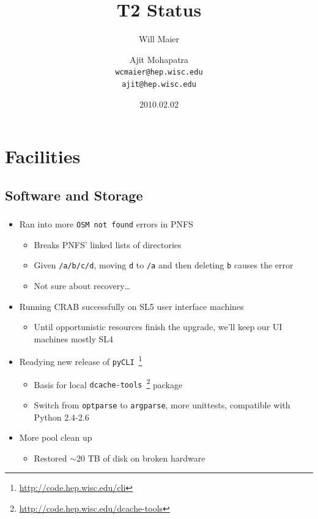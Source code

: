\documentclass{beamer}
\title{T2 Status}
\author[Maier, Mohapatra]{
    Will Maier \and Ajit Mohapatra\\
    {\tt wcmaier@hep.wisc.edu}\\
    {\tt ajit@hep.wisc.edu}}
\institute[Wisconsin]{University of Wisconsin - High Energy Physics}
\date{2010.02.02}
\newcommand{\ca}{\ensuremath{\sim}}
\begin{document}
\begin{frame}
    \titlepage
\end{frame}


\section{Facilities}
\subsection{Software and Storage}
\begin{frame}
\frametitle{}

\begin{itemize}
	\item Ran into more {\tt OSM not found} errors in PNFS
	\begin{itemize}
		\item Breaks PNFS' linked lists of directories
		\item Given {\tt /a/b/c/d}, moving {\tt d} to {\tt /a} and then deleting {\tt b} causes the error
		\item Not sure about recovery\ldots{}
	\end{itemize}
	\item Running CRAB successfully on SL5 user interface machines
	\begin{itemize}
		\item Until opportunistic resources finish the upgrade, we'll keep our UI machines mostly SL4
	\end{itemize}
	\item Readying new release of {\tt pyCLI}~\footnote{\url{http://code.hep.wisc.edu/cli}}
	\begin{itemize}
		\item Basis for local {\tt dcache-tools}~\footnote{\url{http://code.hep.wisc.edu/dcache-tools}} package
		\item Switch from {\tt optparse} to {\tt argparse}, more unittests, compatible with Python 2.4-2.6 
	\end{itemize}
	\item More pool clean up
	\begin{itemize}
		\item Restored \ca{}20 TB of disk on broken hardware
	\end{itemize}
\end{itemize}
\end{frame}
\end{document}
